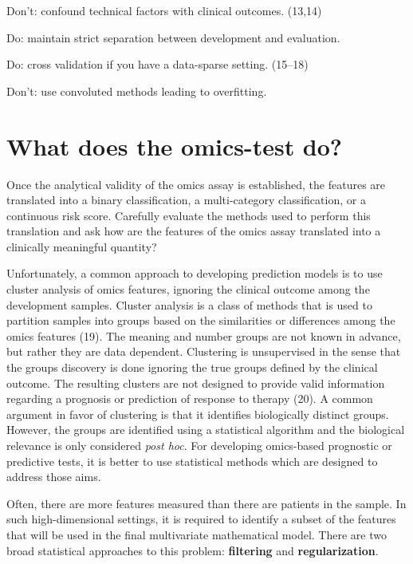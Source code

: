 \documentclass[11pt]{article}
\begin{document}
Don't: confound technical factors with clinical outcomes. (13,14)

Do: maintain strict separation between development and evaluation.

Do: cross validation if you have a data-sparse setting. (15--18)

Don't: use convoluted methods leading to overfitting.

\section{What does the omics-test
do?}\label{what-does-the-omics-test-do}

Once the analytical validity of the omics assay is established, the
features are translated into a binary classification, a multi-category
classification, or a continuous risk score. Carefully evaluate the
methods used to perform this translation and ask how are the features of
the omics assay translated into a clinically meaningful quantity?

Unfortunately, a common approach to developing prediction models is to
use cluster analysis of omics features, ignoring the clinical outcome
among the development samples. Cluster analysis is a class of methods
that is used to partition samples into groups based on the similarities
or differences among the omics features (19). The meaning and number
groups are not known in advance, but rather they are data dependent.
Clustering is unsupervised in the sense that the groups discovery is
done ignoring the true groups defined by the clinical outcome. The
resulting clusters are not designed to provide valid information
regarding a prognosis or prediction of response to therapy (20). A
common argument in favor of clustering is that it identifies
biologically distinct groups. However, the groups are identified using a
statistical algorithm and the biological relevance is only considered
\emph{post hoc}. For developing omics-based prognostic or predictive
tests, it is better to use statistical methods which are designed to
address those aims.

Often, there are more features measured than there are patients in the
sample. In such high-dimensional settings, it is required to identify a
subset of the features that will be used in the final multivariate
mathematical model. There are two broad statistical approaches to this
problem: \textbf{filtering} and \textbf{regularization}.
\end{document}
